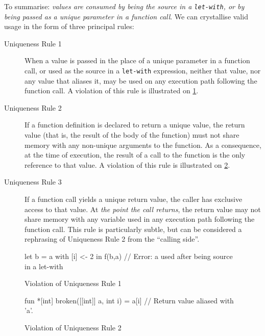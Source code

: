\documentclass[oneside]{memoir}
\newcommand{\emp}[1]{\textcolor{DikuRed}{ #1}}
\begin{document}
To summarise: \textit{values are consumed by being the source in a
  \texttt{let-with}, or by being passed as a \textit{unique} parameter
  in a function call}.  We can crystallise valid usage in the form of
three principal rules:

\begin{description}
\item[Uniqueness Rule 1] When a value is passed in the place of a
  unique parameter in a function call, or used as the source in a
  \texttt{let-with} expression, neither that value, nor any value that
  aliases it, may be used on any execution path following the function
  call.  A violation of this rule is illustrated on
  \cref{fig:uniqueness-rule-1-violation}.

\item[Uniqueness Rule 2] If a function definition is declared to
  return a unique value, the return value (that is, the result of the
  body of the function) must not share memory with any non-unique
  arguments to the function.  As a consequence, at the time of
  execution, the result of a call to the function is the only
  reference to that value.  A violation of this rule is illustrated on
  \cref{fig:uniqueness-rule-2-violation}.

\item[Uniqueness Rule 3] If a function call yields a unique return
  value, the caller has exclusive access to that value.  At
  \textit{the point the call returns}, the return value may not share
  memory with any variable used in any execution path following the
  function call.  This rule is particularly subtle, but can be
  considered a rephrasing of Uniqueness Rule 2 from the ``calling
  side''.
\end{description}

\begin{figure}
\centering
\begin{colorcode}
let b = a with [i] <- 2 in
f(b,a) // \emp{Error:} a used after being source in a let-with
\end{colorcode}
\caption{Violation of Uniqueness Rule 1}
\label{fig:uniqueness-rule-1-violation}
\end{figure}

\begin{figure}
\centering
\begin{colorcode}
fun *[int] broken([[int]] a, int i) =
  a[i] // Return value aliased with 'a'.
\end{colorcode}
\caption{Violation of Uniqueness Rule 2}
\label{fig:uniqueness-rule-2-violation}
\end{figure}
\end{document}

